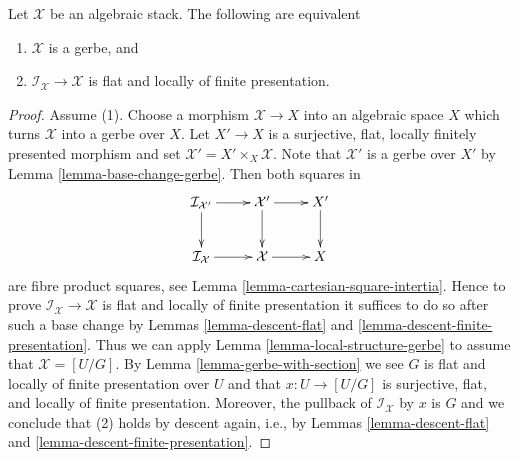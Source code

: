 \begin{proposition}
\label{proposition-when-gerbe}
Let $\mathcal{X}$ be an algebraic stack. The following are equivalent
\begin{enumerate}
\item $\mathcal{X}$ is a gerbe, and
\item $\mathcal{I}_\mathcal{X} \to \mathcal{X}$ is flat and locally of
finite presentation.
\end{enumerate}
\end{proposition}

\begin{proof}
Assume (1). Choose a morphism $\mathcal{X} \to X$ into an algebraic space $X$
which turns $\mathcal{X}$ into a gerbe over $X$. Let $X' \to X$ is a
surjective, flat, locally finitely presented morphism and
set $\mathcal{X}' = X' \times_X \mathcal{X}$. Note that $\mathcal{X}'$
is a gerbe over $X'$ by
Lemma \ref{lemma-base-change-gerbe}.
Then both squares in
$$
\xymatrix{
\mathcal{I}_{\mathcal{X}'} \ar[r] \ar[d] &
\mathcal{X}' \ar[r] \ar[d] & X' \ar[d] \\
\mathcal{I}_\mathcal{X} \ar[r] &
\mathcal{X} \ar[r] & X
}
$$
are fibre product squares, see
Lemma \ref{lemma-cartesian-square-intertia}.
Hence to prove $\mathcal{I}_\mathcal{X} \to \mathcal{X}$ is flat and
locally of finite presentation it suffices to do so after such a base
change by
Lemmas \ref{lemma-descent-flat} and
\ref{lemma-descent-finite-presentation}.
Thus we can apply
Lemma \ref{lemma-local-structure-gerbe}
to assume that $\mathcal{X} = [U/G]$.
By
Lemma \ref{lemma-gerbe-with-section}
we see $G$ is flat and locally of finite presentation over $U$ and
that $x : U \to [U/G]$ is surjective, flat, and locally of finite
presentation. Moreover, the pullback of $\mathcal{I}_\mathcal{X}$
by $x$ is $G$ and we conclude that (2) holds by descent again, i.e., by
Lemmas \ref{lemma-descent-flat} and
\ref{lemma-descent-finite-presentation}.


\end{proof}
